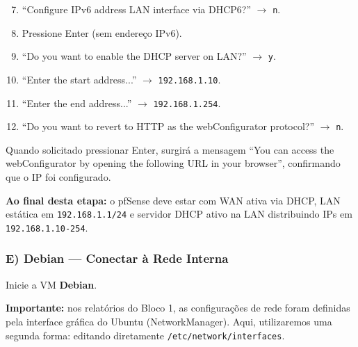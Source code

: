 
\begin{enumerate}\setcounter{enumi}{6}
  \item ``Configure IPv6 address LAN interface via DHCP6?'' $\rightarrow$ \texttt{n}.
  \item Pressione Enter (sem endereço IPv6).
  \item ``Do you want to enable the DHCP server on LAN?'' $\rightarrow$ \texttt{y}.
  \item ``Enter the start address...'' $\rightarrow$ \texttt{192.168.1.10}.
  \item ``Enter the end address...'' $\rightarrow$ \texttt{192.168.1.254}.
\end{enumerate}


\begin{enumerate}\setcounter{enumi}{11}
  \item ``Do you want to revert to HTTP as the webConfigurator protocol?'' $\rightarrow$ \texttt{n}.
\end{enumerate}

Quando solicitado pressionar Enter, surgirá a mensagem ``You can access the webConfigurator by opening the following URL in your browser'', confirmando que o IP foi configurado.


\begin{notebox}
\textbf{Ao final desta etapa:} o pfSense deve estar com WAN ativa via DHCP, LAN estática em \texttt{192.168.1.1/24} e servidor DHCP ativo na LAN distribuindo IPs em \texttt{192.168.1.10-254}.
\end{notebox}

\subsubsection*{E) Debian --- Conectar à Rede Interna}

Inicie a VM \textbf{Debian}.

\begin{warnbox}
\textbf{Importante:} nos relatórios do Bloco 1, as configurações de rede foram definidas pela interface gráfica do Ubuntu (NetworkManager). Aqui, utilizaremos uma segunda forma: editando diretamente \texttt{/etc/network/interfaces}.
\end{warnbox}

